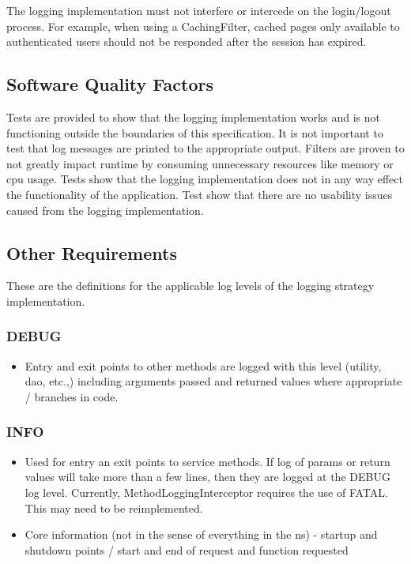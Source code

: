 \documentclass[12pt]{report}
\begin{document}
The logging implementation must not interfere or intercede on the login/logout process. For example, when using a CachingFilter, cached pages
only available to authenticated users should not be responded after the session has expired.

\subsection{Software Quality Factors}
Tests are provided to show that the logging implementation works and is not functioning outside the boundaries of this specification. It is not
important to test that log messages are printed to the appropriate output. Filters are proven to not greatly impact runtime by consuming
unnecessary resources like memory or cpu usage. Tests show that the logging implementation does not in any way effect the functionality of the
application. Test show that there are no usability issues caused from the logging implementation.

\subsection{Other Requirements}
These are the definitions for the applicable log levels of the logging strategy implementation.
\subsubsection{DEBUG}
\begin{itemize}
    \item Entry and exit points to other methods are logged with this level (utility, dao, etc.,) including arguments passed and returned values where appropriate / branches in code.
\end{itemize}

\subsubsection{INFO}
\begin{itemize}
\item Used for entry an exit points to service methods. If log of params or return values will take more than a few lines, then they are logged
  at the DEBUG log level. Currently, MethodLoggingInterceptor requires the use of FATAL. This may need to be reimplemented.
\item Core information (not in the sense of everything in the ns) - startup and shutdown points / start and end of request and function requested
\end{itemize}
\end{document}
